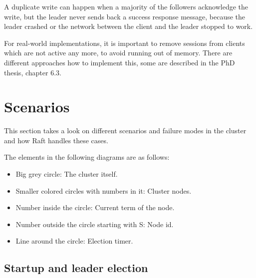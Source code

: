 A duplicate write can happen when a majority of the followers acknowledge the write, but the leader never sends back a success response message, because the leader crashed or the network between the client and the leader stopped to work.

For real-world implementations, it is important to remove sessions from clients which are not active any more, to avoid running out of memory. There are different approaches how to implement this, some are described in the PhD thesis\cite{raft_phd_thesis}, chapter 6.3.

\section{Scenarios}
This section takes a look on different scenarios and failure modes in the cluster and how Raft handles these cases.

The elements in the following diagrams are as follows:
\begin{itemize}
    \item Big grey circle: The cluster itself.
    \item Smaller colored circles with numbers in it: Cluster nodes.
    \item Number inside the circle: Current term of the node.
    \item Number outside the circle starting with S: Node id.
    \item Line around the circle: Election timer.
\end{itemize}

\newcommand{\raftscope}[2]{
  \begin{tabularx}{\textwidth}{  p{120px}  X  }
    \noindent\parbox[c]{\hsize}{
      \def\svgwidth{120}
      \fontsize{9pt}{11pt}\selectfont
      
    } & #2
\end{tabularx}
}



\newcommand{\raftscopedata}[2]{
\begin{tabular}{ p{250px}   p{7cm}  }
\raisebox{-\totalheight+25px}{
  \def\svgwidth{250}
  \fontsize{9pt}{11pt}\selectfont
  
} & #2 
\end{tabular}
}




\subsection{Startup and leader election}


